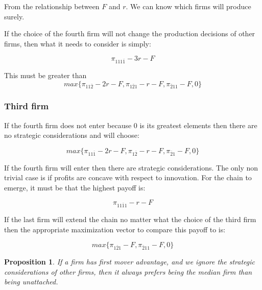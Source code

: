 \documentclass{article}
\newtheorem{proposition}{Proposition}
\begin{document}
From the relationship between $F$ and $r$. We can know which firms will produce surely. 


If the choice of the fourth firm will not change the production decisions of other firms, then what it needs to consider is simply: 


\begin{equation*}
\pi_{111\overline{1}}-3r-F
\end{equation*}

This must be greater than 
\begin{equation*}
max\{\pi_{11\overline{2}}-2r-F,\pi_{1\overline{2}1}-r-F,\pi_{\overline{2}11}-F,0\}    
\end{equation*}



\subsubsection{Third firm}

If the fourth firm does not enter because 0 is its greatest elements then there are no strategic considerations and will choose:

\begin{equation*}
max \{\pi_{11 \overline{1}}-2r-F,\pi_{1\overline{2}}-r-F,\pi_{\overline{2}1}-F,0 \}
\end{equation*}

If the fourth firm will enter then there are strategic considerations. The only non trivial case is if profits are concave with respect to innovation. For the chain to emerge, it must be that the highest payoff is: 

\begin{equation*}
\pi_{11 \overline{1}1}-r-F
\end{equation*}

If the last firm will extend the chain no matter what the choice of the third firm then the appropriate maximization vector to compare this payoff to is: 

\begin{equation*}
max \{ \pi_{1 \overline{2} 1}-F, \pi_{ \overline{2}1 1}-F, 0 \}
\end{equation*}

\begin{proposition}
If a firm has first mover advantage, and we ignore the strategic considerations of other firms, then it always prefers being the median firm than being unattached. 
\end{proposition}
\end{document}
